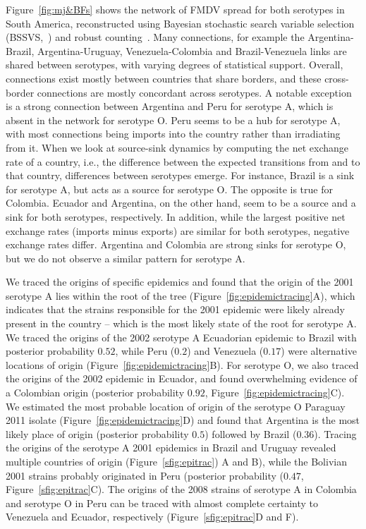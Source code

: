 \documentclass[10pt]{article}
\begin{document}
Figure~\ref{fig:mj&BFs} shows the network of FMDV spread for both serotypes in South America, reconstructed using Bayesian stochastic search variable selection (BSSVS,~\cite{Lemey2009}) and robust counting~\citep{Minin2008b}. %
Many connections, for example the Argentina-Brazil, Argentina-Uruguay, Venezuela-Colombia and Brazil-Venezuela links are shared between serotypes, with varying degrees of statistical support.
Overall, connections exist mostly between countries that share borders, and these cross-border connections are mostly concordant across serotypes.
A notable exception is a strong connection between Argentina and Peru for serotype A, which is absent in the network for serotype O.
Peru seems to be a hub for serotype A, with most connections being imports into the country rather than irradiating from it.
When we look at source-sink dynamics by computing the net exchange rate of a country, i.e., the difference between the expected transitions from and to that country, differences between serotypes emerge.
For instance,  Brazil is a sink for serotype A, but acts as a source for serotype O.
The opposite is true for Colombia.
Ecuador and Argentina, on the other hand, seem to be a source and a sink for both serotypes, respectively.
In addition, while the largest positive net exchange rates (imports minus exports) are similar for both serotypes, negative exchange rates differ. %
Argentina and Colombia are strong sinks for serotype O, but we do not observe a similar pattern for serotype A. 

We traced the origins of specific epidemics and found that the origin of the 2001 serotype A lies within the root of the tree (Figure~\ref{fig:epidemictracing}A), which indicates that the strains responsible for the 2001 epidemic were likely already present in the country -- which is the most likely state of the root for serotype A.
We traced the origins of the 2002 serotype A Ecuadorian epidemic to Brazil with posterior probability $0.52$, while Peru ($0.2$) and Venezuela ($0.17$) were alternative locations of origin (Figure~\ref{fig:epidemictracing}B).
For serotype O, we also traced the origins of the 2002 epidemic in Ecuador, and found overwhelming evidence of a Colombian origin (posterior probability $0.92$, Figure~\ref{fig:epidemictracing}C).
We estimated the most probable location of origin of the serotype O Paraguay 2011 isolate (Figure~\ref{fig:epidemictracing}D) and found that Argentina is the most likely place of origin (posterior probability $0.5$) followed by Brazil ($0.36$).
Tracing the origins of the serotype A 2001 epidemics in Brazil and Uruguay revealed multiple countries of origin (Figure~\ref{sfig:epitrac}) A and B), while the Bolivian 2001 strains probably originated in Peru (posterior probability ($0.47$, Figure~\ref{sfig:epitrac}C).
The origins of the 2008 strains of serotype A in Colombia and serotype O in Peru can be traced with almost complete certainty to Venezuela and Ecuador, respectively (Figure~\ref{sfig:epitrac}D and F).
\end{document}
